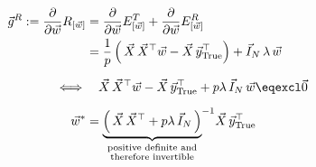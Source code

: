 \begin{frame}
\begin{align}
\vec g^R :=  \frac{\partial}{\partial \vec w} R_{[\vec w]}
&= \frac{\partial}{\partial \vec w} E^T_{[\vec w]} + \frac{\partial}{\partial \vec w} E^R_{[\vec w]}\\
&= \frac{1}{p} \left(\, \vec X \, \vec X^\top \vec w - \vec X\, \vec y_{\text{True}}^\top \right) + \vec I_N \, \lambda \, \vec w\\[2mm]
\iff& \quad \vec X \, \vec X^\top \vec w - \vec X\, \vec y_{\text{True}}^\top + p \lambda \, \vec I_N \,  \vec w \eqexcl \vec 0\\[2mm]
\vec w^* &=  {\underbrace{
\left(\, \vec X \, \vec X^\top + p \lambda \, \vec I_N \,  \right)
}_{
\substack{
\text{positive definite and}\\
\text{therefore invertible}\\
}
}
}^{-1} \vec X \, \vec y_{\mathrm{True}}^{\top}
\end{align}

\end{frame}
